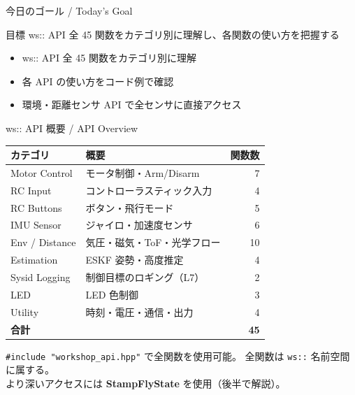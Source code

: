 \begin{frame}{今日のゴール / Today's Goal}
  \begin{block}{目標}
    ws:: API 全 45 関数をカテゴリ別に理解し、各関数の使い方を把握する
  \end{block}

  \vspace{0.5em}

  \begin{itemize}
    \item ws:: API 全 45 関数をカテゴリ別に理解
    \item 各 API の使い方をコード例で確認
    \item 環境・距離センサ API で全センサに直接アクセス
  \end{itemize}
\end{frame}


\begin{frame}{ws:: API 概要 / API Overview}
  \vspace{0.3em}
  \centering
  {\small
  \begin{tabular}{llr}
    \hline
    \textbf{カテゴリ} & \textbf{概要} & \textbf{関数数} \\
    \hline
    Motor Control   & モータ制御・Arm/Disarm    & 7 \\
    RC Input        & コントローラスティック入力 & 4 \\
    RC Buttons      & ボタン・飛行モード         & 5 \\
    IMU Sensor      & ジャイロ・加速度センサ     & 6 \\
    Env / Distance  & 気圧・磁気・ToF・光学フロー & 10 \\
    Estimation      & ESKF 姿勢・高度推定        & 4 \\
    Sysid Logging   & 制御目標のロギング（L7）   & 2 \\
    LED             & LED 色制御                 & 3 \\
    Utility         & 時刻・電圧・通信・出力     & 4 \\
    \hline
    \multicolumn{2}{l}{\textbf{合計}} & \textbf{45} \\
    \hline
  \end{tabular}
  }

  \vspace{0.5em}
  {\footnotesize
    \texttt{\#include "workshop\_api.hpp"} で全関数を使用可能。
    全関数は \texttt{ws::} 名前空間に属する。\\
    より深いアクセスには \textbf{StampFlyState} を使用（後半で解説）。
  }
\end{frame}

